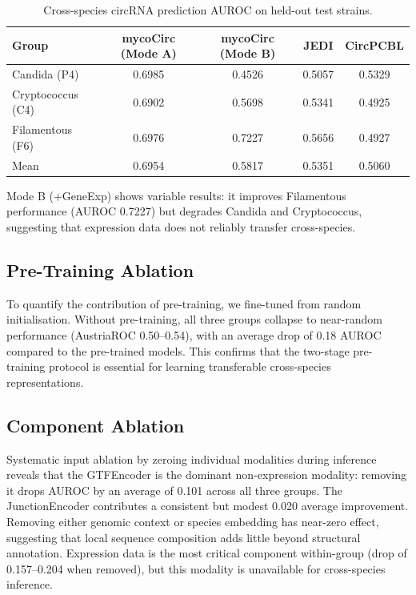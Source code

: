 \documentclass[12pt]{article}
\begin{document}
\begin{table}[h]
\centering
\caption{Cross-species circRNA prediction AUROC on held-out test strains.}
\label{tab:main}
\begin{tabular}{lcccc}
\hline
Group & mycoCirc (Mode A) & mycoCirc (Mode B) & JEDI & CircPCBL \\
\hline
Candida (P4) & 0.6985 & 0.4526 & 0.5057 & 0.5329 \\
Cryptococcus (C4) & 0.6902 & 0.5698 & 0.5341 & 0.4925 \\
Filamentous (F6) & 0.6976 & 0.7227 & 0.5656 & 0.4927 \\
\hline
Mean & 0.6954 & 0.5817 & 0.5351 & 0.5060 \\
\hline
\end{tabular}
\end{table}

Mode B ($+$GeneExp) shows variable results: it improves Filamentous performance (AUROC 0.7227) but degrades Candida and Cryptococcus, suggesting that expression data does not reliably transfer cross-species.

\subsection{Pre-Training Ablation}

To quantify the contribution of pre-training, we fine-tuned from random initialisation. Without pre-training, all three groups collapse to near-random performance (AustriaROC 0.50--0.54), with an average drop of 0.18 AUROC compared to the pre-trained models. This confirms that the two-stage pre-training protocol is essential for learning transferable cross-species representations.

\subsection{Component Ablation}

Systematic input ablation by zeroing individual modalities during inference reveals that the GTFEncoder is the dominant non-expression modality: removing it drops AUROC by an average of 0.101 across all three groups. The JunctionEncoder contributes a consistent but modest 0.020 average improvement. Removing either genomic context or species embedding has near-zero effect, suggesting that local sequence composition adds little beyond structural annotation. Expression data is the most critical component within-group (drop of 0.157--0.204 when removed), but this modality is unavailable for cross-species inference.
\end{document}
